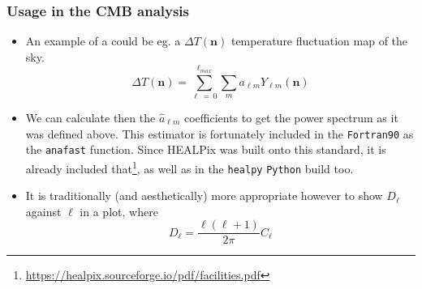 \begin{frame}
\frametitle{Usage in the CMB analysis}

\begin{itemize}
	\item<1-> An example of a  could be eg. a $\Delta T \left( \mathbf{n} \right)$ temperature fluctuation map of the sky.
	\begin{equation*}
		\Delta T \left( \mathbf{n} \right)
		=
		\sum_{\ell\,=\,0}^{\ell_{max}} \sum_{m} a_{\ell m} Y_{\ell m} \left( \mathbf{n} \right)
	\end{equation*}
	\item<2-> We can calculate then the $\hat{a}_{\ell m}$ coefficients to get the power spectrum as it was defined above. This estimator is fortunately included in the \texttt{Fortran90} as the \texttt{anafast} function. Since HEALPix was built onto this standard, it is already included that\footnote{\url{https://healpix.sourceforge.io/pdf/facilities.pdf}}, as well as in the \texttt{healpy} \texttt{Python} build too.
	\item<3-> It is traditionally (and aesthetically) more appropriate however to show $D_{\ell}$ against $\ell$ in a plot, where
	\begin{equation*}
		D_{\ell}
		=
		\frac{\ell \left( \ell + 1 \right)}{2 \pi} C_{\ell}
	\end{equation*}
\end{itemize}

\end{frame}